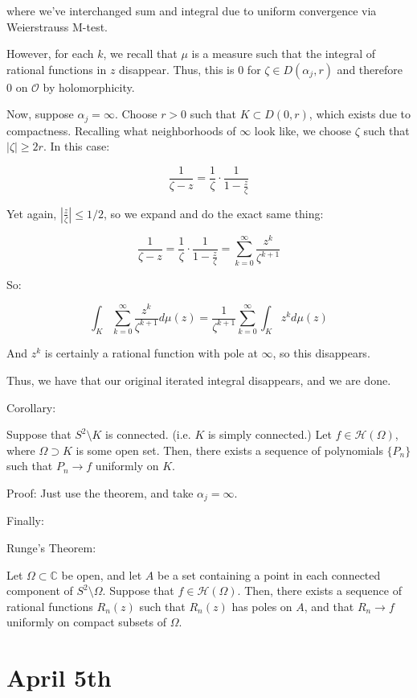\documentclass[10pt]{article}
\newcommand{\calH}{\mathcal{H}}
\begin{document}
where we’ve interchanged sum and integral due to uniform convergence via Weierstrauss M-test.

However, for each $k$, we recall that $\mu$ is a measure such that the integral of rational functions in $z$ disappear. Thus, this is $0$ for $\zeta \in D(\alpha_j, r)$ and therefore $0$ on $\mathcal{O}$ by holomorphicity.

Now, suppose $\alpha_j = \infty$. Choose $r > 0$ such that $K \subset D(0,r)$, which exists due to compactness. Recalling what neighborhoods of $\infty$ look like, we choose $\zeta$ such that $|\zeta| \geq 2r$. In this case:

$$\frac{1}{\zeta - z} = \frac{1}{\zeta} \cdot \frac{1}{1 - \frac{z}{\zeta}} $$

Yet again, $\left| \frac{z}{\zeta}\right| \leq 1/2$, so we expand and do the exact same thing:

$$\frac{1}{\zeta - z} = \frac{1}{\zeta} \cdot \frac{1}{1 - \frac{z}{\zeta}} = \sum_{k=0}^\infty \frac{z^k}{\zeta^{k+1}} $$

So:

$$\int_K \sum_{k=0}^\infty \frac{z^k}{\zeta^{k+1}}  d\mu(z) = \frac{1}{\zeta^{k+1}} \sum_{k=0}^\infty \int_K  z^k d\mu(z) $$

And $z^k$ is certainly a rational function with pole at $\infty$, so this disappears.

Thus, we have that our original iterated integral disappears, and we are done.

Corollary:

Suppose that $S^2 \setminus K$ is connected. (i.e. $K$ is simply connected.) Let $f \in \calH(\Omega)$, where $\Omega \supset K$ is some open set. Then, there exists a sequence of polynomials $\{ P_n \}$ such that $P_n \to f$ uniformly on $K$.

Proof: Just use the theorem, and take $\alpha_j = \infty$. 

Finally:

Runge’s Theorem:

Let $\Omega \subset \mathbb{C}$ be open, and let $A$ be a set containing a point in each connected component of $S^2 \setminus \Omega$. Suppose that $f \in \calH(\Omega)$. Then, there exists a sequence of rational functions $R_n(z)$ such that $R_n(z)$ has poles on $A$, and that $R_n \to f$ uniformly on compact subsets of $\Omega$. 

\section*{April 5th}
\end{document}
